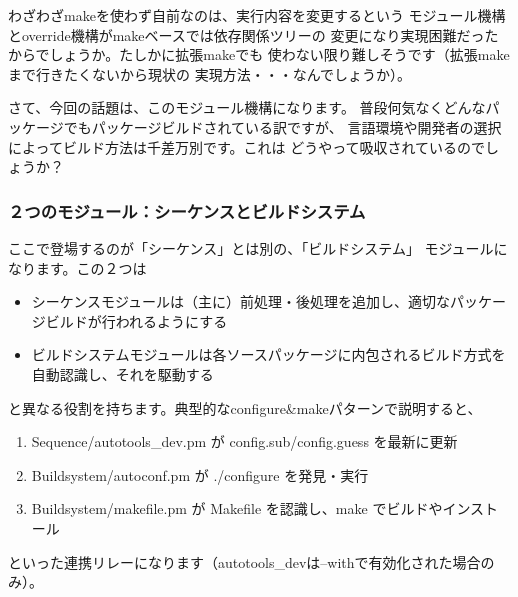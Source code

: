 \documentclass[mingoth,a4paper]{jsarticle}
\begin{document}
わざわざmakeを使わず自前なのは、実行内容を変更するという
モジュール機構とoverride機構がmakeベースでは依存関係ツリーの
変更になり実現困難だったからでしょうか。たしかに拡張makeでも
使わない限り難しそうです（拡張makeまで行きたくないから現状の
実現方法・・・なんでしょうか）。

さて、今回の話題は、このモジュール機構になります。
普段何気なくどんなパッケージでもパッケージビルドされている訳ですが、
言語環境や開発者の選択によってビルド方法は千差万別です。これは
どうやって吸収されているのでしょうか？

\subsubsection{２つのモジュール：シーケンスとビルドシステム}
ここで登場するのが「シーケンス」とは別の、「ビルドシステム」
モジュールになります。この２つは
\begin{itemize}
\item シーケンスモジュールは（主に）前処理・後処理を追加し、適切なパッケージビルドが行われるようにする
\item ビルドシステムモジュールは各ソースパッケージに内包されるビルド方式を自動認識し、それを駆動する
\end{itemize}
と異なる役割を持ちます。典型的なconfigure\&makeパターンで説明すると、
\begin{enumerate}
\item Sequence/autotools\_dev.pm が config.sub/config.guess を最新に更新
\item Buildsystem/autoconf.pm が ./configure を発見・実行
\item Buildsystem/makefile.pm が Makefile を認識し、make でビルドやインストール
\end{enumerate}
といった連携リレーになります（autotools\_devは--withで有効化された場合のみ）。
\end{document}
